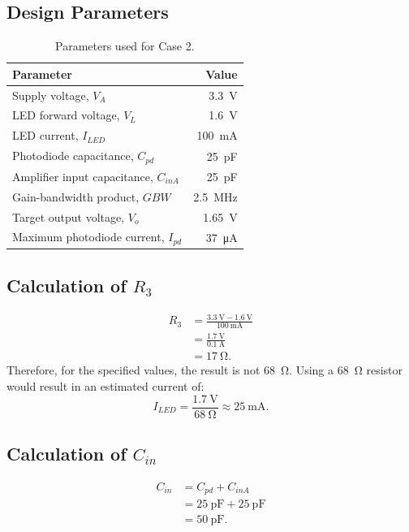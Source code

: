 \documentclass[12pt,a4paper]{article}
\begin{document}
\subsection{Design Parameters}
\begin{table}[h!]
\centering
\begin{tabular}{>{\raggedright\arraybackslash}p{7cm}r}
\toprule
Parameter & Value \\
\midrule
Supply voltage, $V_A$ & \SI{3.3}{\volt}\\
LED forward voltage, $V_L$ & \SI{1.6}{\volt}\\
LED current, $I_{LED}$ & \SI{100}{\milli\ampere}\\
Photodiode capacitance, $C_{pd}$ & \SI{25}{\pico\farad}\\
Amplifier input capacitance, $C_{inA}$ & \SI{25}{\pico\farad}\\
Gain-bandwidth product, $GBW$ & \SI{2.5}{\mega\hertz}\\
Target output voltage, $V_o$ & \SI{1.65}{\volt}\\
Maximum photodiode current, $I_{pd}$ & \SI{37}{\micro\ampere}\\
\bottomrule
\end{tabular}
\caption{Parameters used for Case 2.}
\end{table}

\subsection{Calculation of $R_3$}
\begin{align}
  R_3 &= \frac{\SI{3.3}{\volt}-\SI{1.6}{\volt}}
               {\SI{100}{\milli\ampere}}\\
      &= \frac{\SI{1.7}{\volt}}{\SI{0.1}{\ampere}}\\
      &= \boxed{\SI{17}{\ohm}}.
\end{align}
Therefore, for the specified values, the result is not \SI{68}{\ohm}.
Using a \SI{68}{\ohm} resistor would result in an estimated current of:
\begin{equation}
  I_{LED} = \frac{\SI{1.7}{\volt}}{\SI{68}{\ohm}}
           \approx \SI{25}{\milli\ampere}.
\end{equation}

\subsection{Calculation of $C_{in}$}
\begin{align}
  C_{in} &= C_{pd}+C_{inA}\\
         &= \SI{25}{\pico\farad}+\SI{25}{\pico\farad}\\
         &= \boxed{\SI{50}{\pico\farad}}.
\end{align}
\end{document}
